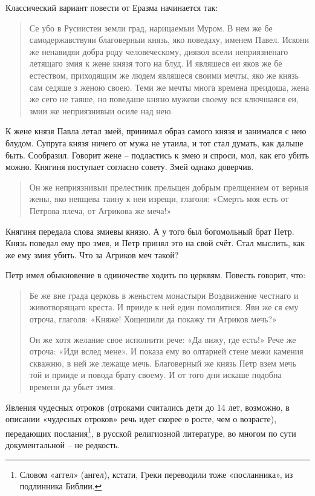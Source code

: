 Классический вариант повести от Еразма\cite[стр. 454-463]{izbornik01} начинается так:

\begin{quotation}
Се убо в Русиистеи земли град, нарицаемыи Муром. В нем же бе самодержавствуяи благоверныи князь, яко поведаху, именем Павел. Искони же ненавидяи добра роду человеческому, диявол всели неприязненаго летящаго змия к жене князя того на блуд. И являшеся еи яков же бе естеством, приходящим же людем являшеся своими мечты, яко же князь сам седяше з женою своею. Теми же мечты многа времена преидоша, жена же сего не таяше, но поведаше князю мужеви своему вся ключшаяся еи, змии же неприязнивыи осиле над нею.
\end{quotation}

К жене князя Павла летал змей, принимал образ самого князя и занимался с нею блудом. Супруга князя ничего от мужа не утаила, и тот стал думать, как дальше быть. Сообразил. Говорит жене – подластись к змею и спроси, мол, как его убить можно. Княгиня поступает согласно совету. Змей однако доверчив.

\begin{quotation}
Он же неприязнивыи прелестник прельщен добрым прелщением от верныя жены, яко непщева таину к неи изрещи, глаголя: «Смерть моя есть от Петрова плеча, от Агрикова же меча!»
\end{quotation}

Княгиня передала слова змиевы князю. А у того был богомольный брат Петр. Князь поведал ему про змея, и Петр принял это на свой счёт. Стал мыслить, как же ему змия убить. Что за Агриков меч такой?

Петр имел обыкновение в одиночестве ходить по церквям. Повесть говорит, что: 

\begin{quotation}
Бе же вне града церковь в женьстем монастыри Воздвижение честнаго и животворящаго креста. И прииде к ней един помолитися. Яви же ся ему отроча, глаголя: «Княже! Хощешили да покажу ти Агриков мечь?»

Он же хотя желание свое исполнити рече: «Да вижу, где есть!» Рече же отроча: «Иди вслед мене». И показа ему во олтарней стене межи камения скважню, в ней же лежаще мечь. Благоверный же князь Петр взем мечь той и прииде и повода брату своему. И от того дни искаше подобна времени да убьет змия.
\end{quotation}

Явления чудесных отроков (отроками считались дети до 14 лет, возможно, в описании «чудесных отроков» речь идет скорее о росте, чем о возрасте), передающих послания\footnote{Словом «аггел» (ангел), кстати, Греки переводили тоже «посланника», из подлинника Библии.}, в русской религиозной литературе, во многом по сути документальной – не редкость.

